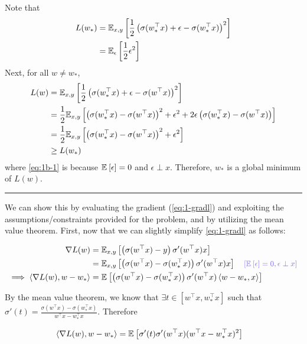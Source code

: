 \documentclass[11pt]{article}
\newcommand{\1}{\mathbb{I}} %
\begin{document}
Note that 
\begin{align}
	L(w_*) 
		&= \E[x,y]{\onehalf \lr{ \sigma(w_*^\top x) + \epsilon - \sigma(w_*^\top x) }^2 } \\
		&= \E[\epsilon]{\onehalf \epsilon^2}
\end{align}
Next, for all $w \neq w_*$,
\begin{align}
	L(w) 
		&= \E[x,y]{\onehalf \lr{ \sigma(w_*^\top x) + \epsilon - \sigma(w^\top x) }^2 } \\
		&= \onehalf \E[x,y]{\lr{\sigma(w_*^\top x) - \sigma(w^\top x)}^2 + \epsilon^2 + 2\epsilon\lr{\sigma(w_*^\top x) - \sigma(w^\top x)}} \\
		&= \onehalf \E[x,y]{\lr{\sigma(w_*^\top x) - \sigma(w^\top x)}^2 + \epsilon^2 } \label{eq:1b-1} \\
		&\geq L(w_*)
\end{align}
where \ref{eq:1b-1} is because $\E{\epsilon} = 0$ and $\epsilon \perp x$. Therefore, $w_*$ is a global minimum of $L(w)$. \\

\hrule



We can show this by evaluating the gradient (\ref{eq:1-gradl}) and exploiting the assumptions/constraints provided for the problem, and by utilizing the mean value theorem. First, now that we can slightly simplify \ref{eq:1-gradl} as follows:

\begin{align}
	\nabla L(w)
		&= \E[x,y]{ \lr{\sigma(w^\top x) - y}  \sigma'(w^\top x) x } \\
		&= \E[x,y]{ \lr{\sigma(w^\top x) - \sigma(w^\top_* x)}  \sigma'(w^\top x) x } 
			\quad \mblue{[ \E{\epsilon} = 0, \epsilon \perp x ]} \\
	\implies 
	\innerprod{\nabla L(w)}{w - w_*}
		&= \E{ \lr{\sigma(w^\top x) - \sigma(w^\top_* x)}  \sigma'(w^\top x) \innerprod{w - w_*}{x} } 
\end{align}

By the mean value theorem, we know that $\exists t \in [w^\top x, w_*^\top x]$ such that $\sigma'(t) = \frac{ \sigma(w^\top x) - \sigma(w^\top_* x) }{ w^\top x - w^\top_* x }$. Therefore 

\begin{align}
	\innerprod{\nabla L(w)}{w - w_*}
	&= \E{ \sigma'(t)  \sigma'(w^\top x) (w^\top x - w^\top_* x)^2  } 
\end{align}
\end{document}

